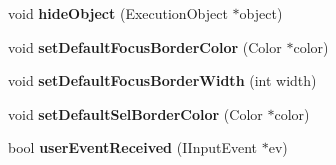\begin{CompactItemize}
\item 
void \textbf{hideObject} (ExecutionObject $\ast$object)\label{classbr_1_1pucrio_1_1telemidia_1_1ginga_1_1ncl_1_1focus_1_1FormatterFocusManager_e92309574fa337dbe79478ce3d52f941}

\item 
void \textbf{setDefaultFocusBorderColor} (Color $\ast$color)\label{classbr_1_1pucrio_1_1telemidia_1_1ginga_1_1ncl_1_1focus_1_1FormatterFocusManager_3d3dcebbe04c32f56f92b19dec0cf126}

\item 
void \textbf{setDefaultFocusBorderWidth} (int width)\label{classbr_1_1pucrio_1_1telemidia_1_1ginga_1_1ncl_1_1focus_1_1FormatterFocusManager_c68b036cc90f1c0432a6a888ab914d3a}

\item 
void \textbf{setDefaultSelBorderColor} (Color $\ast$color)\label{classbr_1_1pucrio_1_1telemidia_1_1ginga_1_1ncl_1_1focus_1_1FormatterFocusManager_1b50eefa3f2997d07a54166092a30199}

\item 
bool \textbf{userEventReceived} (IInputEvent $\ast$ev)\label{classbr_1_1pucrio_1_1telemidia_1_1ginga_1_1ncl_1_1focus_1_1FormatterFocusManager_1520ea57105d2db3e7f818b4d60667af}

\end{CompactItemize}

